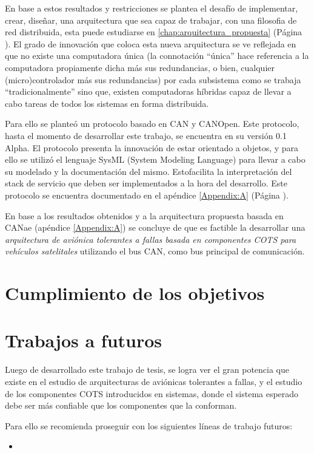 En base a estos resultados y restricciones se plantea el desafío de implementar,
crear, diseñar, una arquitectura que sea capaz de trabajar, con una filosofia
de red distribuida, esta puede estudiarse en \ref{chap:arquitectura_propuesta}
(Página \pageref{chap:arquitectura_propuesta}). El grado de innovación que coloca
esta nueva arquitectura se ve reflejada en que no existe una computadora única (la
connotación ``única'' hace referencia a la computadora propiamente dicha más sus
redundancias, o bien, cualquier (micro)controlador más sus redundancias) por cada
subsistema como se trabaja ``tradicionalmente'' sino que, existen computadoras
híbridas capaz de llevar a cabo tareas de todos los sistemas en forma distribuida. 

Para ello se planteó un protocolo basado en CAN y CANOpen. Este protocolo, hasta el
momento de desarrollar este trabajo, se encuentra en su versión 0.1 Alpha. El protocolo
presenta la innovación de estar orientado a objetos, y para ello se utilizó el
lenguaje SysML (System Modeling Language) para llevar a cabo su modelado y
la documentación del mismo. Estofacilita la interpretación del
stack de servicio que deben ser implementados a la hora del desarrollo. Este protocolo
se encuentra documentado en el apéndice \ref{Appendix:A} (Página \pageref{Appendix:A}).

En base a los resultados obtenidos y a la arquitectura propuesta basada en CANae
(apéndice \ref{Appendix:A}) se concluye de que es factible la desarrollar una
\textit{arquitectura de aviónica tolerantes a fallas basada en componentes COTS para
  vehículos satelitales} utilizando el bus CAN, como bus principal de comunicación.

\section{Cumplimiento de los objetivos}

\section{Trabajos a futuros}
Luego de desarrollado este trabajo de tesis, se logra ver el gran potencia que existe
en el estudio de arquitecturas de aviónicas tolerantes a fallas, y el estudio
de los componentes COTS introducidos en sistemas, donde el sistema esperado debe ser
más confiable que los componentes que la conforman.

Para ello se recomienda proseguir con los siguientes líneas de trabajo futuros:
\begin{itemize}
\item 
\end{itemize}

